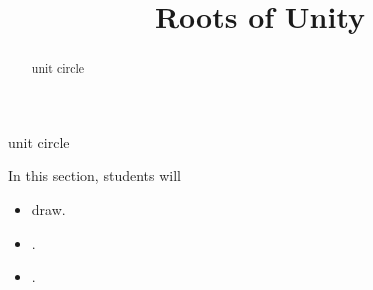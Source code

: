 \documentclass{ximera}
\title{Roots of Unity}
\begin{document}
\begin{abstract}
unit circle
\end{abstract}
\maketitle




unit circle


























\begin{sectionOutcomes}
In this section, students will 

\begin{itemize}
\item draw.
\item .
\item .
\end{itemize}
\end{sectionOutcomes}
\end{document}
